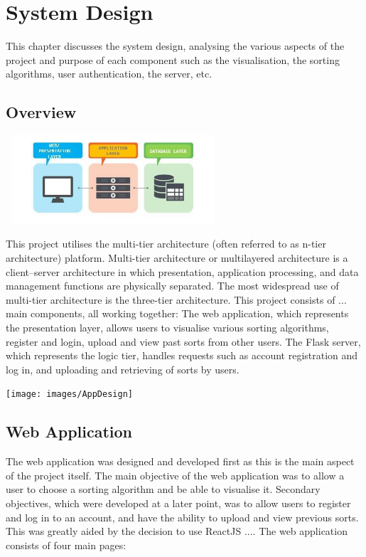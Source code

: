 \chapter{System Design}
This chapter discusses the system design, analysing the various aspects of the project and purpose of each component such as the visualisation, the sorting algorithms, user authentication, the server, etc.

\section{Overview}
\begin{center}
    \includegraphics[width=8cm,height=3.3cm,keepaspectratio]{images/3tier}
\end{center}

This project utilises the multi-tier architecture (often referred to as n-tier architecture) platform. Multi-tier architecture or multilayered architecture is a client–server architecture in which presentation, application processing, and data management functions are physically separated. The most widespread use of multi-tier architecture is the three-tier architecture. This project consists of ... main components, all working together: The web application, which represents the presentation layer, allows users to visualise various sorting algorithms, register and login, upload and view past sorts from other users. The Flask server, which represents the logic tier, handles requests such as account registration and log in, and uploading and retrieving of sorts by users.

\begin{center}
    \texttt{[image: images/AppDesign]}
\end{center}
\newpage

\section{Web Application}
The web application was designed and developed first as this is the main aspect of the project itself. The main objective of the web application was to allow a user to choose a sorting algorithm and be able to visualise it. Secondary objectives, which were developed at a later point, was to allow users to register and log in to an account, and have the ability to upload and view previous sorts. This was greatly aided by the decision to use ReactJS .... The web application consists of four main pages: 

